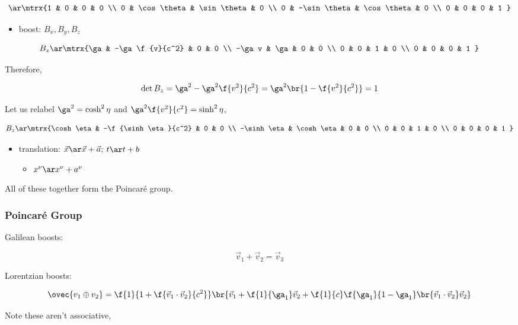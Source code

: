 \documentclass{article}
\begin{document}
\[ \ar \mtrx{1 & 0 & 0 & 0 \\ 0 & \cos \theta & \sin \theta & 0 \\ 0 & -\sin \theta & \cos \theta & 0 \\ 0 & 0 & 0 & 1 } \]

\begin{itemize}
    \item boost: $B_x, B_y, B_z$
\end{itemize}

\[ B_z \ar \mtrx{\ga & -\ga\f{v}{c^2} & 0 & 0 \\ -\ga v & \ga & 0 & 0 \\ 0 & 0 & 1 & 0 \\ 0 & 0 & 0 & 1 } \]

Therefore,

\[ \det B_z = \ga^2 - \ga^2 \f{v^2}{c^2} = \ga^2\br{1-\f{v^2}{c^2}} = 1 \]

Let us relabel $\ga^2 = \cosh^2 \eta$ and $\ga^2\f{v^2}{c^2} = \sinh^2 \eta$,

\[ B_z \ar \mtrx{\cosh \eta & -\f{\sinh \eta}{c^2} & 0 & 0 \\ -\sinh \eta & \cosh \eta & 0 & 0 \\ 0 & 0 & 1 & 0 \\ 0 & 0 & 0 & 1 } \]

\begin{itemize}
    \item translation: $\vec{x} \ar \vec{x} + \vec{a}$; $t \ar t + b$
    \begin{itemize}
        \item $x^\nu \ar x^\nu + a^\nu$
    \end{itemize}
\end{itemize}

All of these together form the Poincaré group.

\subsubsection{Poincaré Group}

Galilean boosts:

\[ \vec{v}_1 + \vec{v}_2 = \vec{v}_3 \]

Lorentzian boosts:

\[ \ovec{v_1 \oplus v_2} = \f{1}{1+\f{\vec{v}_1\cdot\vec{v}_2}{c^2}}\br{\vec{v}_1 + \f{1}{\ga_1}\vec{v}_2 + \f{1}{c}\f{\ga_1}{1-\ga_1}\br{\vec{v}_1\cdot\vec{v}_2} \vec{v}_2}\]

Note these aren't associative,
\end{document}
